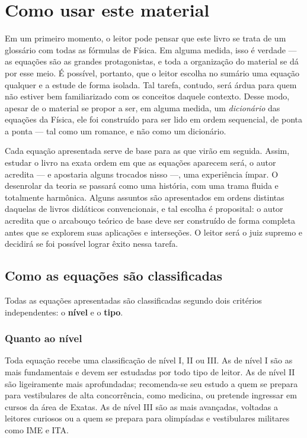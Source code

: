 
\chapter*{Como usar este material}



Em um primeiro momento, o leitor pode pensar que este livro se trata de um glossário
com todas as fórmulas de Física. Em alguma medida, isso é verdade --- as equações são
as grandes protagonistas, e toda a organização do material se dá por esse meio. É
possível, portanto, que o leitor escolha no sumário uma equação qualquer e a estude de
forma isolada. Tal tarefa, contudo, será árdua para quem não estiver bem familiarizado
com os conceitos daquele contexto. Desse modo, apesar de o material se propor a ser,
em alguma medida, um \emph{dicionário} das equações da Física, ele foi construído para
ser lido em ordem sequencial, de ponta a ponta --- tal como um romance, e não como
um dicionário.

Cada equação apresentada serve de base para as que virão em seguida. Assim, estudar
o livro na exata ordem em que as equações aparecem será, o autor acredita --- e
apostaria alguns trocados nisso ---, uma experiência ímpar. O desenrolar da teoria
se passará como uma história, com uma trama fluida e totalmente harmônica. Alguns
assuntos são apresentados em ordens distintas daquelas de livros didáticos
convencionais, e tal escolha é proposital: o autor acredita que o arcabouço teórico
de base deve ser construído de forma completa antes que se explorem suas aplicações
e interseções. O leitor será o juiz supremo e decidirá se foi possível lograr êxito nessa tarefa.


\section*{Como as equações são classificadas}

Todas as equações apresentadas são classificadas segundo dois critérios independentes: o \textbf{nível}
e o \textbf{tipo}.

\subsection*{Quanto ao nível}

Toda equação recebe uma classificação de nível I, II ou III. As de nível I são as
mais fundamentais e devem ser estudadas por todo tipo de leitor. As de nível II são
ligeiramente mais aprofundadas; recomenda-se seu estudo a quem se prepara para
vestibulares de alta concorrência, como medicina, ou pretende ingressar em cursos da área de Exatas.
As de nível III são as mais avançadas, voltadas a leitores curiosos ou a quem se
prepara para olimpíadas e vestibulares militares como IME e ITA.


